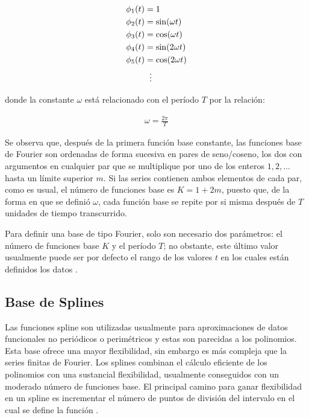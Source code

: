 \documentclass[
]{book}
\begin{document}
\begin{align}
    \phi_1(t)&=1\\
    \phi_2(t)&=\sin(\omega t)\\
    \phi_3(t)&=\cos(\omega t)\\
    \phi_4(t)&=\sin(2\omega t)\\
    \phi_5(t)&=\cos(2\omega t)\\
    & \hspace{0.2cm}\vdots
\end{align}

donde la constante \(\omega\) está relacionado con el período \(T\) por la relación:

\begin{align}
    \omega =\frac{2\pi}{T}
\end{align}

Se observa que, después de la primera función base constante, las funciones base de Fourier son ordenadas de forma sucesiva en pares de seno/coseno, los dos con argumentos en cualquier par que se multiplique por uno de los enteros \(1,2,...\) hasta un límite superior \(m\). Si las series contienen ambos elementos de cada par, como es usual, el número de funciones base es \(K=1+2m\), puesto que, de la forma en que se definió \(\omega\), cada función base se repite por si misma después de \(T\) unidades de tiempo transcurrido.

Para definir una base de tipo Fourier, solo son necesario dos parámetros: el número de funciones base \(K\) y el período \(T\); no obstante, este último valor usualmente puede ser por defecto el rango de los valores \(t\) en los cuales están definidos los datos \citep{programsay}.

\hypertarget{base-de-splines}{%
\subsection*{Base de Splines}\label{base-de-splines}}

Las funciones spline son utilizadas usualmente para aproximaciones de datos funcionales no periódicos o perimétricos y estas son parecidas a los polinomios. Esta base ofrece una mayor flexibilidad, sin embargo es más compleja que la series finitas de Fourier. Los splines combinan el cálculo eficiente de los polinomios con una sustancial flexibilidad, usualmente conseguidos con un moderado número de funciones base. El principal camino para ganar flexibilidad en un spline es incrementar el número de puntos de división del intervalo en el cual se define la función \citep{ramsay}.
\end{document}
